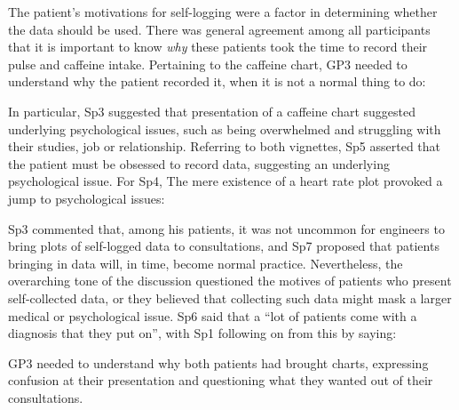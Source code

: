 \documentclass{sigchi}
\begin{document}
The patient's motivations for self-logging were a factor in determining whether the data should be used. There was general agreement among all participants that it is important to know \emph{why} these patients took the time to record their pulse and caffeine intake. Pertaining to the caffeine chart, GP3 needed to understand why the patient recorded it, when it is not a normal thing to do:


In particular, Sp3 suggested that presentation of a caffeine chart suggested underlying psychological issues, such as being overwhelmed and struggling with their studies, job or relationship. Referring to both vignettes, Sp5 asserted that the patient must be obsessed to record data, suggesting an underlying psychological issue. For Sp4, The mere existence of a heart rate plot provoked a jump to psychological issues:


Sp3 commented that, among his patients, it was not uncommon for engineers to bring plots of self-logged data to consultations, and Sp7 proposed that patients bringing in data will, in time, become normal practice. Nevertheless, the overarching tone of the discussion questioned the motives of patients who present self-collected data, or they believed that collecting such data might mask a larger medical or psychological issue. Sp6 said that a ``lot of patients come with a diagnosis that they put on'', with Sp1 following on from this by saying:


GP3 needed to understand why both patients had brought charts, expressing confusion at their presentation and questioning what they wanted out of their consultations.

\end{document}
